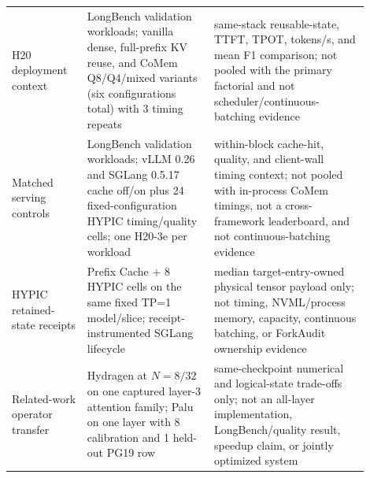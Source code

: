 \documentclass{article}
\begin{document}
\begin{longtable}{@{}>{\raggedright\arraybackslash}p{0.19\linewidth}>{\raggedright\arraybackslash}p{0.32\linewidth}>{\raggedright\arraybackslash}p{0.39\linewidth}@{}}
  H20 deployment context & 8 LongBench validation workloads; vanilla dense, full-prefix KV reuse, and CoMem Q8/Q4/mixed variants (six configurations total) with 3 timing repeats & same-stack reusable-state, TTFT, TPOT, tokens/s, and mean F1 comparison; not pooled with the primary factorial and not scheduler/continuous-batching evidence \\
  Matched serving controls & 8 LongBench validation workloads; vLLM 0.26 and SGLang 0.5.17 cache off/on plus 24 fixed-configuration HYPIC timing/quality cells; one H20-3e per workload & within-block cache-hit, quality, and client-wall timing context; not pooled with in-process CoMem timings, not a cross-framework leaderboard, and not continuous-batching evidence \\
  HYPIC retained-state receipts & 8 Prefix Cache + 8 HYPIC cells on the same fixed TP=1 model/slice; receipt-instrumented SGLang lifecycle & median target-entry-owned physical tensor payload only; not timing, NVML/process memory, capacity, continuous batching, or ForkAudit ownership evidence \\
  Related-work operator transfer & Hydragen at $N=8/32$ on one captured layer-3 attention family; Palu on one layer with 8 calibration and 1 held-out PG19 row & same-checkpoint numerical and logical-state trade-offs only; not an all-layer implementation, LongBench/quality result, speedup claim, or jointly optimized system \\
\end{longtable}
\endgroup
\end{document}
